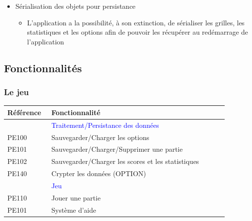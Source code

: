 \documentclass[a4paper, 12pt, twoside]{article}
\begin{document}
\begin{itemize}\setlength{\itemsep}{3mm}

 \item[\textbullet] Sérialisation des objets pour persistance\newline
 \begin{itemize}
  \item L'application a la possibilité, à son extinction,  de sérialiser les grilles, les statistiques et les options afin de pouvoir les récupérer au redémarrage de l'application
 \end{itemize}
 
\end{itemize}

\subsection{Fonctionnalités}

\subsubsection*{Le jeu}

\begin{center}

  \begin{tabular}{|>{\centering\arraybackslash}m{0.2\linewidth}|>{\centering\arraybackslash}m{0.7\linewidth}|@{}m{0cm}@{}}
  \hline
  \textbf{R\'ef\'erence} & \textbf{Fonctionnalit\'e} \\
  \hline
  & \textcolor{blue}{Traitement/Persistance des donn\'ees} &\\[5ex]
  \hline
  PE100 & Sauvegarder/Charger les options\\
  \hline
  PE101 & Sauvegarder/Charger/Supprimer une partie\\
  \hline
  PE102 & Sauvegarder/Charger les scores et les statistiques\\
  \hline
  PE140 & Crypter les données (OPTION)\\
  \hline
  & \textcolor{blue}{Jeu} &\\[5ex]
  \hline
  PE110 & Jouer une partie\\
  \hline
  PE101 & Système d'aide\\
  \hline
  \end{tabular}

\end{center}
\end{document}
